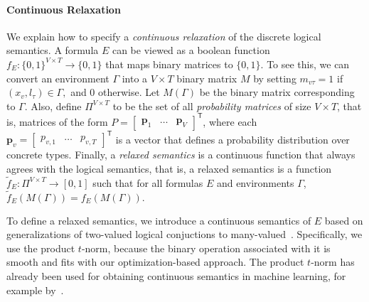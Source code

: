 \documentclass[sigplan,10pt,review,anonymous]{acmart} %
\theoremstyle{plain}
\theoremstyle{remark}
\theoremstyle{definition}
\begin{document}
\paragraph{Continuous Relaxation}
We explain how to specify a \emph{continuous relaxation} of the discrete logical semantics.
A formula $E$ can be viewed as a boolean function $f_E: \{0, 1\}^{V \times T} \rightarrow \{0, 1\}$
that maps binary matrices to $\{0, 1\}$.
To see this, we can convert an environment
$\Gamma$ into a $V \times T$ binary matrix $M$ by setting $m_{v\tau} = 1$ if
$(x_v, l_\tau) \in \Gamma,$ and 0 otherwise.
Let $M(\Gamma)$ be the binary
matrix corresponding to $\Gamma$.
Also, define $\Pi^{V \times T}$ to be the set
of all \emph{probability matrices} of size $V \times T$,
that is, matrices of the form $P = \begin{bmatrix} \bm{p}_1 & \ldots & \bm{p}_{V} \end{bmatrix}^\mathsf{T}$,
where each $\bm{p}_v = \begin{bmatrix} p_{v,1} & \ldots & p_{v,{T}} \end{bmatrix}^\mathsf{T}$
is a vector that defines a probability distribution over concrete types.
Finally, a \emph{relaxed semantics} is a continuous function
that always agrees with the logical semantics, that is,
a relaxed semantics is a function
$\tilde{f}_{E} : \Pi^{V \times T}  \rightarrow [0, 1]$
such that for all formulas $E$ and environments $\Gamma$,
$\tilde{f}_{E}(M(\Gamma)) = f_E(M(\Gamma)).$

To define a relaxed semantics, we introduce a continuous semantics of $E$ based on generalizations of two-valued logical conjuctions
to many-valued~\cite{hajek1998}.
Specifically, we use the product $t$-norm, because the binary operation associated with it is smooth and fits with our optimization-based approach.
The product $t$-norm has already been used for obtaining continuous semantics in machine learning, for example by~\citet{rocktaschel15}.
\end{document}
